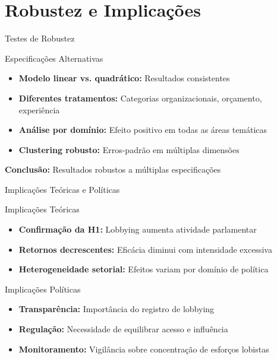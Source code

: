 \documentclass[aspectratio=169]{beamer}
\begin{document}

\section{Robustez e Implicações}

\begin{frame}{Testes de Robustez}
\begin{block}{Especificações Alternativas}
\begin{itemize}
\item \textbf{Modelo linear vs. quadrático:} Resultados consistentes
\item \textbf{Diferentes tratamentos:} Categorias organizacionais, orçamento, experiência
\item \textbf{Análise por domínio:} Efeito positivo em todas as áreas temáticas
\item \textbf{Clustering robusto:} Erros-padrão em múltiplas dimensões
\end{itemize}
\end{block}

\vspace{0.3cm}

\textbf{Conclusão:} Resultados robustos a múltiplas especificações
\end{frame}

\begin{frame}{Implicações Teóricas e Políticas}
\begin{block}{Implicações Teóricas}
\begin{itemize}
\item \textbf{Confirmação da H1:} Lobbying aumenta atividade parlamentar
\item \textbf{Retornos decrescentes:} Eficácia diminui com intensidade excessiva
\item \textbf{Heterogeneidade setorial:} Efeitos variam por domínio de política
\end{itemize}
\end{block}

\begin{block}{Implicações Políticas}
\begin{itemize}
\item \textbf{Transparência:} Importância do registro de lobbying
\item \textbf{Regulação:} Necessidade de equilibrar acesso e influência
\item \textbf{Monitoramento:} Vigilância sobre concentração de esforços lobistas
\end{itemize}
\end{block}
\end{frame}
\end{document}
